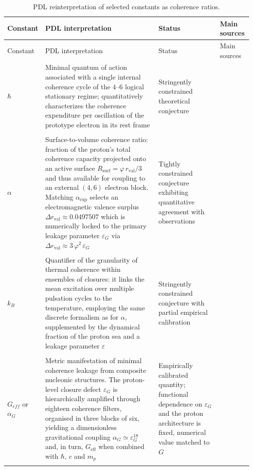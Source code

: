 \documentclass[11pt,a4paper]{article}
\begin{document}
\begin{longtable}{@{}L{1.5cm}L{7.3cm}L{4.2cm}p{1.8cm}@{}}
  \caption{PDL reinterpretation of selected constants as coherence ratios.}
  \label{tab:constants_status}\\

  \toprule
  Constant & PDL interpretation & Status & Main sources \\
  \midrule
  \endfirsthead

  \toprule
  Constant & PDL interpretation & Status & Main sources \\
  \midrule
  \endhead

  \bottomrule
  \endfoot

  $\hbar$ &
  Minimal quantum of action associated with a single internal coherence cycle of the $4$--$6$ logical stationary regime; quantitatively characterizes the coherence expenditure per oscillation of the prototype electron in its rest frame &
  Stringently constrained theoretical conjecture &
  \citep{PDL_Main_2026,PDL_intro,PDL_position} \\\\[0.4em]

  $\alpha$ & 
  Surface-to-volume coherence ratio: fraction of the proton's total coherence capacity projected onto an active surface $R_{\text{surf}}=\varphi\, r_{\text{val}}/3$ and thus available for coupling to an external $(4,6)$ electron block. Matching $\alpha_{\text{exp}}$ selects an electromagnetic valence surplus $\Delta r_{\text{val}} \approx 0.0497507$ which is numerically locked to the primary leakage parameter $\varepsilon_G$ via $\Delta r_{\text{val}} \approx 3\,\varphi^2\,\varepsilon_G$ & Tightly constrained conjecture exhibiting quantitative agreement with observations 
  &
\cite{Alpha_PDL_v2_2026,Universal_Coherence_Leakage_2026} \\\\[0.4em]

  $k_B$ &
  Quantifier of the granularity of thermal coherence within ensembles of closures: it links the mean excitation over multiple pulsation cycles to the temperature, employing the same discrete formalism as for $\alpha$, supplemented by the dynamical fraction of the proton sea and a leakage parameter $\varepsilon$ &
  Stringently constrained conjecture with partial empirical calibration &
  \citep{PDL_Main_2026,Coherence_Leakage_18_2026,PDL_position} \\\\[0.4em]

  $G_{eff}$ or $\alpha_G$ & 
  Metric manifestation of minimal coherence leakage from composite nucleonic structures. The proton-level closure defect $\varepsilon_G$ is hierarchically amplified through eighteen coherence filters, organised in three blocks of six, yielding a dimensionless gravitational coupling $\alpha_G \simeq \varepsilon_G^{18}$ and, in turn, $G_{\text{eff}}$ when combined with $\hbar$, $c$ and $m_p$ & Empirically calibrated quantity; functional dependence on $\varepsilon_G$ and the proton architecture is fixed, numerical value matched to $G$ 
  & \cite{Exponent_18_PDL_2026,Topological_Reformulation_PDL_2026,Universal_Coherence_Leakage_2026} \\\\[0.4em]


\end{longtable}
\end{document}
